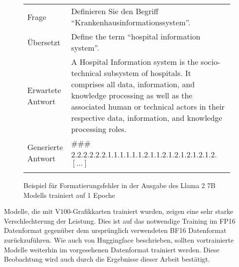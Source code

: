 \begin{figure}
    \begin{tabularx}{\textwidth}{lX}
        \toprule
        Frage              & Definieren Sie den Begriff \enquote{Krankenhausinformationssystem}.                                                                                                                                                                                                    \\
        Übersetzt          & Define the term ``hospital information system''.                                                                                                                                                                                                                       \\
        Erwartete Antwort  & A Hospital Information system is the socio-technical subsystem of hospitals. It comprises all data, information, and knowledge processing as well as the associated human or technical actors in their respective data, information, and knowledge processing roles. \\
        Generierte Antwort & \#\#\# 2.2.2.2.2.2.1.1.1.1.1.1.2.1.1.2.1.2.1.2.1.2.1.2. $[\dots]$                                                                                                                                                                                                    \\
        \bottomrule                                                                                                                                                                                                                                                                                 \\
    \end{tabularx}
    \caption{Beispiel für Formatierungsfehler in der Ausgabe des Llama 2 7B Modells trainiert auf 1 Epoche}\label{fig:formatting-errors}
\end{figure}

Modelle, die mit V100-Grafikkarten trainiert wurden, zeigen eine sehr starke Verschlechterung der Leistung.
Dies ist auf das notwendige Training im FP16 Datenformat gegenüber dem ursprünglich verwendeten BF16 Datenformat zurückzuführen.
Wie auch von Huggingface beschrieben, sollten vortrainierte Modelle weiterhin im vorgesehenen Datenformat trainiert werden.
Diese Beobachtung wird auch durch die Ergebnisse dieser Arbeit bestätigt.\\


